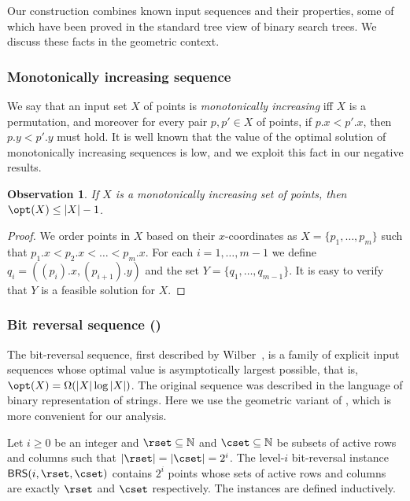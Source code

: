 \documentclass[11pt]{article}
\numberwithin{equation}{section}
\theoremstyle{definition}
\theoremstyle{plain}
\newtheorem{myobs}[theorem]{Observation}
\begin{document}
Our construction combines known input sequences and their properties, some of which have been proved in the standard tree view of binary search trees.  We discuss these facts in the geometric context. 

 \subsubsection{Monotonically increasing sequence} 
 
 We say that an input set $X$ of points is \emph{monotonically increasing} iff $X$ is a permutation, and moreover for every pair $p,p'\in X$ of points, if $p.x <p'.x$, then $p.y<p'.y$ must hold.
It is well known that the value of the optimal solution of monotonically increasing sequences is low, and we exploit this fact in our negative results.
%

\begin{myobs}\label{obs: solution for monotone increasing set}
        If $X$ is a monotonically increasing set of points, then $\opt(X)\leq |X|-1$.
\end{myobs}
 \begin{proof}
We order points in $X$ based on their $x$-coordinates as $X = \{p_1,\ldots, p_m\}$ such that $p_1.x < p_2.x <\ldots < p_m.x$.
For each $i =1,\ldots, m-1$ we define $q_i = ((p_i).x, (p_{i+1}).y)$ and the set $Y = \{q_1,\ldots, q_{m-1}\}$. It is easy to verify that $Y$ is a feasible solution for $X$. 
 \end{proof}



\subsubsection{Bit reversal sequence (\BRS)} 


The bit-reversal sequence, first described by Wilber~\cite{wilber}, is a family of explicit input sequences whose optimal value is asymptotically largest possible, that is, $\opt(X) = \Omega(|X| \log |X|)$. 
The original sequence was described in the language of binary representation of strings. Here we use the geometric variant of \BRS, which is more convenient for our analysis. 

Let $i \geq 0$ be an integer and  $\rset \subseteq {\mathbb N}$ and $\cset \subseteq {\mathbb N}$ be subsets of active rows and columns such that  $|\rset|=|\cset|=2^i$. 
The level-$i$ bit-reversal instance ${\sf BRS}(i,\rset,\cset)$ contains $2^i$ points whose sets of active rows and columns are exactly $\rset$ and $\cset$ respectively. 
The instances are defined inductively. 
\end{document}
